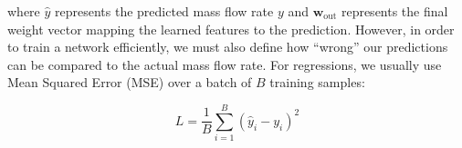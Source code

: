 \documentclass{article}
\begin{document}
where \(\hat{y}\) represents the predicted mass flow rate \(y\) and \(\mathbf{w}_{\text{out}}\) represents the final weight vector mapping 
the learned features to the prediction. However, in order to train a network efficiently, we must also define how ``wrong'' our predictions can be 
compared to the actual mass flow rate. For regressions, we usually use Mean Squared Error (MSE) over a batch of \(B\) training samples: 

\begin{equation}
        L = \frac{1}{B}\sum_{i=1}^B (\hat{y}_i - y_i)^2
\end{equation}

% 

\newpage



\newpage 


\end{document}
